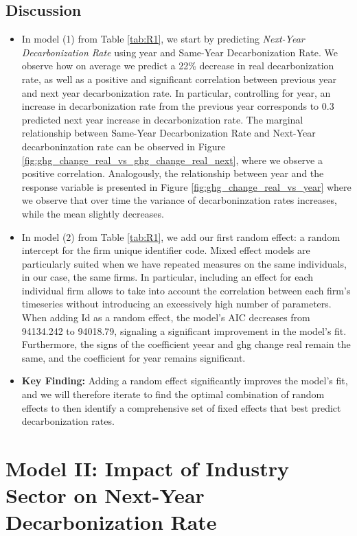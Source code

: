\subsection{Discussion}
\begin{itemize}
    \item In model (1) from Table \ref{tab:R1}, we start by predicting \textit{Next-Year Decarbonization Rate} using year and Same-Year Decarbonization Rate. We observe how on average we predict a 22\% decrease in real decarbonization rate, as well as a positive and significant correlation between previous year and next year decarbonization rate. In particular, controlling for year, an increase in decarbonization rate from the previous year corresponds to 0.3 predicted next year increase in decarbonization rate. The marginal relationship between Same-Year Decarbonization Rate and Next-Year decarboninzation rate can be observed in Figure \ref{fig:ghg_change_real_vs_ghg_change_real_next}, where we observe a positive correlation. Analogously, the relationship between year and the response variable is presented in Figure \ref{fig:ghg_change_real_vs_year} where we observe that over time the variance of decarboninzation rates increases, while the mean slightly decreases.
    \item In model (2) from Table \ref{tab:R1}, we add our first random effect: a random intercept for the firm unique identifier code. Mixed effect models are particularly suited when we have repeated measures on the same individuals, in our case, the same firms. In particular, including an effect for each individual firm allows to take into account the correlation between each firm's timeseries without introducing an excessively high number of parameters. When adding Id as a random effect, the model's AIC decreases from 94134.242 to 94018.79, signaling a significant improvement in the model's fit. Furthermore, the signs of the coefficient yeear and ghg change real remain the same, and the coefficient for year remains significant. 
    \item \textbf{Key Finding:} Adding a random effect significantly improves the model's fit, and we will therefore iterate to find the optimal combination of random effects to then identify a comprehensive set of fixed effects that best predict decarbonization rates. 
\end{itemize}






\section{Model II: Impact of Industry Sector on Next-Year Decarbonization Rate}

